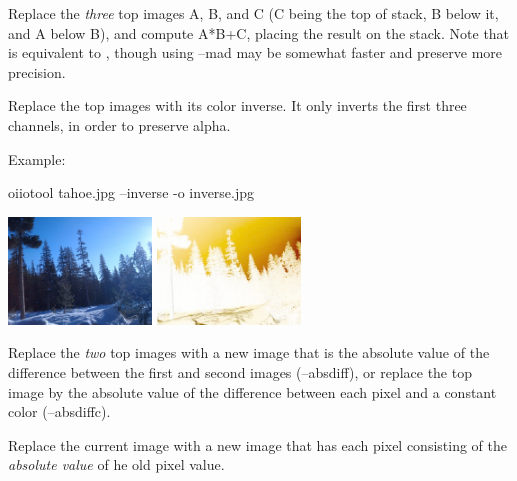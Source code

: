 Replace the \emph{three} top images A, B, and C (C being the top of stack, B
below it, and A below B), and compute A*B+C, placing the result on the
stack. Note that  is equivalent to ,
though using {\cf --mad} may be somewhat faster and preserve more precision.

\apiend


Replace the top images with its color inverse. It only inverts the first
three channels, in order to preserve alpha.

\noindent Example:
\begin{code}
   oiiotool tahoe.jpg --inverse -o inverse.jpg
\end{code}
\spc \includegraphics[width=1.5in]{figures/tahoe-small.jpg}
\raisebox{40pt}{\large $\rightarrow$}
\includegraphics[width=1.5in]{figures/invert.jpg} \\
\apiend


Replace the \emph{two} top images with a new image that is the absolute
value of the difference between the first and second images ({\cf --absdiff}),
or replace the top image by the absolute value of the difference between each
pixel and a constant color ({\cf --absdiffc}).
\apiend

Replace the current image with a new image that has each pixel
consisting of the \emph{absolute value} of he old pixel value.
\apiend

